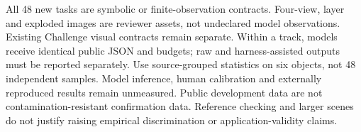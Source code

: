 All 48 new tasks are symbolic or finite-observation contracts. Four-view,
layer and exploded images are reviewer assets, not undeclared model
observations. Existing Challenge visual contracts remain separate.
Within a track, models receive identical public JSON and budgets;
raw and harness-assisted outputs must be reported separately.
Use source-grouped statistics on six objects, not 48 independent samples.
Model inference, human calibration and externally reproduced results
remain unmeasured. Public development data are not contamination-resistant
confirmation data. Reference checking and larger scenes do not justify
raising empirical discrimination or application-validity claims.
